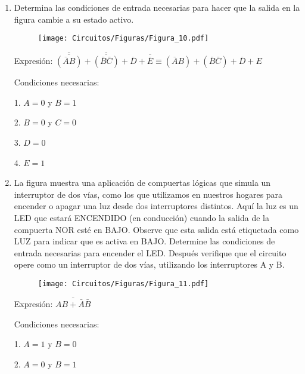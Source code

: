 \documentclass[a4paper, 12pt]{article}
\newcommand{\Aspace}{0.2cm}
\begin{document}
\begin{enumerate}
        \newpage
        \item Determina las condiciones de entrada necesarias para hacer que la salida en la figura cambie a su estado activo.
        \begin{figure}[!ht]
            \centering
            \texttt{[image: Circuitos/Figuras/Figura\_10.pdf]}
        \end{figure}
            \vspace{\Aspace} \par
            { \color{azul} 
                Expresión: $\overline{\overline{(\overline{A}B)}} + \overline{\overline{(\bar{B}\bar{C})}} + \overline{D} + \overline{\overline{E}} \equiv (\overline{A}B) + (\bar{B}\bar{C}) + \overline{D} + E$
                \par Condiciones necesarias:
                \par 1. $A = 0$ y $B = 1$
                \par 2. $B = 0$ y $C = 0$
                \par 3. $D = 0$
                \par 4. $E = 1$
            }



        \item La figura muestra una aplicación de compuertas lógicas que simula un interruptor de dos vías, como los que utilizamos en nuestros hogares para encender o apagar una luz desde dos interruptores distintos. Aquí la luz es un LED que estará ENCENDIDO (en conducción) cuando la salida de la compuerta NOR esté en BAJO. Observe que esta salida está etiquetada como LUZ para indicar que es activa en BAJO. Determine las condiciones de entrada necesarias para encender el LED. Después verifique que el circuito opere como un interruptor de dos vías, utilizando los interruptores A y B.
        \begin{figure}[!ht]
            \centering
            \texttt{[image: Circuitos/Figuras/Figura\_11.pdf]}
        \end{figure}
            { \color{azul} 
                \par Expresión: $\overline{AB + \bar{A}\bar{B}}$
                \par Condiciones necesarias:
                \par 1. $A = 1$ y $B = 0$
                \par 2. $A = 0$ y $B = 1$
            }



    \end{enumerate}
\end{document}
